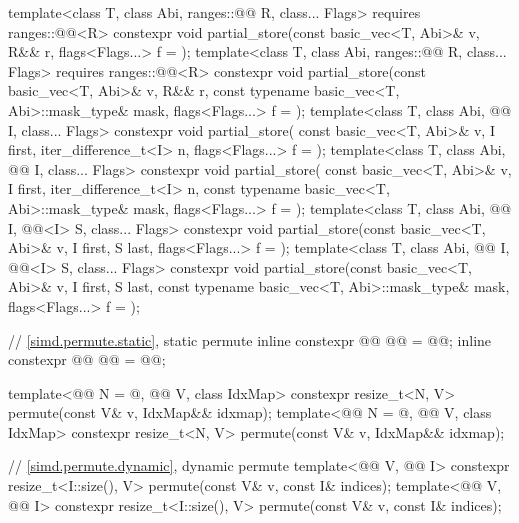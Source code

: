 \begin{codeblock}
{  template<class T, class Abi, ranges::@@ R, class... Flags>
    requires ranges::@@<R>
    constexpr void partial_store(const basic_vec<T, Abi>& v, R&& r,
                                 flags<Flags...> f = {});
  template<class T, class Abi, ranges::@@ R, class... Flags>
    requires ranges::@@<R>
    constexpr void partial_store(const basic_vec<T, Abi>& v, R&& r,
                                 const typename basic_vec<T, Abi>::mask_type& mask,
                                 flags<Flags...> f = {});
  template<class T, class Abi, @@ I, class... Flags>
    constexpr void partial_store(
      const basic_vec<T, Abi>& v, I first, iter_difference_t<I> n, flags<Flags...> f = {});
  template<class T, class Abi, @@ I, class... Flags>
    constexpr void partial_store(
      const basic_vec<T, Abi>& v, I first, iter_difference_t<I> n,
      const typename basic_vec<T, Abi>::mask_type& mask, flags<Flags...> f = {});
  template<class T, class Abi, @@ I, @@<I> S, class... Flags>
    constexpr void partial_store(const basic_vec<T, Abi>& v, I first, S last,
                                 flags<Flags...> f = {});
  template<class T, class Abi, @@ I, @@<I> S, class... Flags>
    constexpr void partial_store(const basic_vec<T, Abi>& v, I first, S last,
                                 const typename basic_vec<T, Abi>::mask_type& mask,
                                 flags<Flags...> f = {});

  // \ref{simd.permute.static}, static permute
  inline constexpr @@ @@   = @@;
  inline constexpr @@ @@ = @@;

  template<@@ N = @\seebelow@, @@ V, class IdxMap>
    constexpr resize_t<N, V> permute(const V& v, IdxMap&& idxmap);
  template<@@ N = @\seebelow@, @@ V, class IdxMap>
    constexpr resize_t<N, V> permute(const V& v, IdxMap&& idxmap);

  // \ref{simd.permute.dynamic}, dynamic permute
  template<@@ V, @@ I>
    constexpr resize_t<I::size(), V> permute(const V& v, const I& indices);
  template<@@ V, @@ I>
    constexpr resize_t<I::size(), V> permute(const V& v, const I& indices);

}
\end{codeblock}
